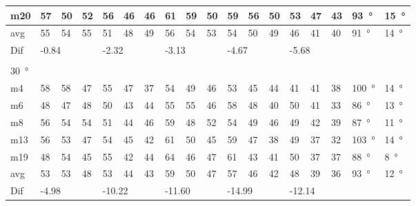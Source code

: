 \begin{table}[H]
\begin{tabular}{l|l|l|l|l|l|l|l|l|l|l|l|l|l|l|l|l|l}
m20  & 57     &  50    &  52    &  56    &  46    &    46  &   61   &   59    &   50   &  59     &  56    &   50   & 53 & 47 &  43&  \SI{93}{\degree} & \SI{15}{\degree} \\ \hline
avg & 55     &  54    &  55    &  51    &  48    &   49   &  56    &  54     & 53     &  54     &  50    &   49   & 46 & 41  &40 &  \SI{91}{\degree} & \SI{14}{\degree} \\ \hline  
Dif & \multicolumn{3}{l|}{-0.84} & \multicolumn{3}{l|}{-2.32} & \multicolumn{3}{l|}{-3.13} & \multicolumn{3}{l|}{-4.67} &  \multicolumn{3}{l|}{-5.68} &  \multicolumn{2}{l}{}  \\ 
 \multicolumn{18}{l}{ } \\                         
\SI{30}{\degree}   & \multicolumn{3}{l|}{} & \multicolumn{3}{l|}{} & \multicolumn{3}{l|}{} & \multicolumn{3}{l|}{} &  \multicolumn{3}{l|}{} &  \multicolumn{2}{l}{}   \\  \hline
m4    &  58    &  58    & 47     & 55     &  47    &   37   &   54   &   49    &  46    &   53    &   45   &   44   & 41 & 41 & 38 & \SI{100}{\degree} & \SI{14}{\degree} \\
m6    &  48    &   47   &  48    & 50     &   43   &  44    &    55  &   55    &  46    &   58    &   48   &   40   & 50 & 41 & 33 & \SI{86}{\degree} & \SI{13}{\degree} \\
m8    &  56    &  54    & 54     &  51    &  44    &   46   &   59   &   48    &  52    &   54    &    49  &   46   & 49 & 42 & 39 & \SI{87}{\degree} & \SI{11}{\degree}  \\
m13  &   56   & 53     &   47   & 54     &   45   &   42   &   61   &   50    &  45    &   59    &   47   &   38   & 49 & 37 & 32 &  \SI{103}{\degree} & \SI{14}{\degree} \\
m19  &  48    &  54    &  45    &  55    &  42    &   44   &   64   &    46   &  47    &   61    &   43   &    41  & 50 & 37 & 37 &  \SI{88}{\degree} & \SI{8}{\degree} \\ \hline
avg &  53    &   53   &  48    &  53    &  44    & 43     &  59    &   50    & 47     &   57    & 46     &   42   & 48 & 39  &36 &  \SI{93}{\degree} & \SI{12}{\degree} \\ \hline  
Dif & \multicolumn{3}{l|}{-4.98} & \multicolumn{3}{l|}{-10.22} & \multicolumn{3}{l|}{-11.60} & \multicolumn{3}{l|}{-14.99} &  \multicolumn{3}{l|}{-12.14}    &  \multicolumn{2}{l}{}                           
\end{tabular}
\end{table}




